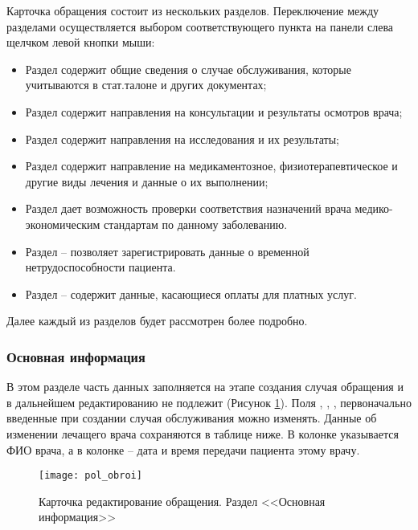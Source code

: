 Карточка обращения состоит из нескольких разделов. Переключение между разделами осуществляется выбором соответствующего пункта на панели слева щелчком левой кнопки мыши:
\begin{itemize}
 \item Раздел  содержит общие сведения о случае обслуживания, которые учитываются в стат.талоне и других документах;
 \item Раздел  содержит направления на консультации и результаты осмотров врача;
 \item Раздел  содержит направления на исследования и их результаты;
 \item Раздел  содержит направление на медикаментозное, физиотерапевтическое и другие виды лечения и данные о их выполнении;
 \item Раздел  дает возможность проверки соответствия назначений врача медико-экономическим стандартам по данному заболеванию.
 \item Раздел  – позволяет зарегистрировать данные о временной нетрудоспособности пациента. 
 \item Раздел  – содержит данные, касающиеся оплаты для платных услуг.
\end{itemize}
 
Далее каждый из разделов будет рассмотрен более подробно.

\subsubsection{Основная информация}

В этом разделе часть данных заполняется на этапе создания случая обращения и в дальнейшем редактированию не подлежит (Рисунок \ref{img_pol_obroi}). Поля , , , первоначально введенные при создании случая обслуживания можно изменять. Данные об изменении лечащего врача сохраняются в таблице ниже. В колонке  указывается ФИО врача, а в колонке  – дата и время передачи пациента этому врачу.

\begin{figure}[ht]\centering
 \texttt{[image: pol\_obroi]}
 \caption{Карточка редактирование обращения. Раздел <<Основная информация>>}
 \label{img_pol_obroi}
\end{figure}


